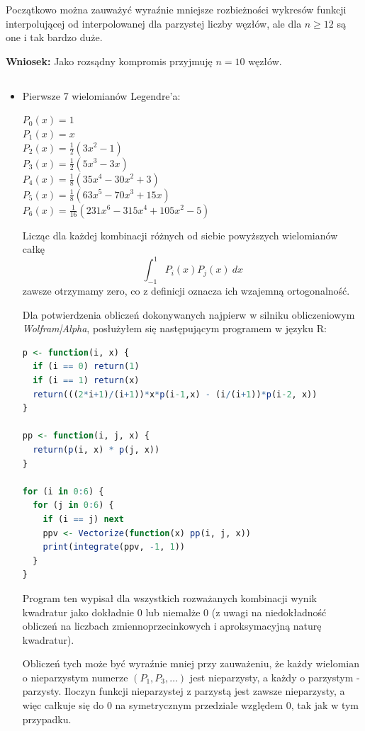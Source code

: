 \documentclass{article}
\begin{document}
\newpage
\noindent
Początkowo można zauważyć wyraźnie mniejsze rozbieżności wykresów funkcji interpolującej od interpolowanej dla parzystej liczby węzłów, ale dla \(n \geq 12\) są one i tak bardzo duże.

\vspace{3mm}
\noindent
\textbf{Wniosek:} Jako rozsądny kompromis przyjmuję \(n = 10\) węzłów.

\subsection{}
\begin{itemize}
    \item Pierwsze 7 wielomianów Legendre'a:
    
    \(P_0(x) = 1\)\\
    \(P_1(x) = x\)\\
    \(P_2(x) = \frac{1}{2}(3x^2 - 1)\)\\
    \(P_3(x) = \frac{1}{2}(5x^3 - 3x)\)\\
    \(P_4(x) = \frac{1}{8}(35x^4 - 30x^2 + 3)\)\\
    \(P_5(x) = \frac{1}{8}(63x^5 - 70x^3 + 15x)\)\\
    \(P_6(x) = \frac{1}{16}(231x^6 - 315x^4 + 105x^2 - 5)\)
    
    Licząc dla każdej kombinacji różnych od siebie powyższych wielomianów całkę
    \[\int_{-1}^1 P_i(x)P_j(x)\ dx\]
    zawsze otrzymamy zero, co z definicji oznacza ich wzajemną ortogonalność.

    Dla potwierdzenia obliczeń dokonywanych najpierw w silniku obliczeniowym \textit{Wolfram|Alpha}, posłużyłem się następującym programem w języku R:
\begin{lstlisting}[language=R]
p <- function(i, x) {
  if (i == 0) return(1)
  if (i == 1) return(x)
  return(((2*i+1)/(i+1))*x*p(i-1,x) - (i/(i+1))*p(i-2, x))
}

pp <- function(i, j, x) {
  return(p(i, x) * p(j, x))
}

for (i in 0:6) {
  for (j in 0:6) {
    if (i == j) next
    ppv <- Vectorize(function(x) pp(i, j, x))
    print(integrate(ppv, -1, 1))
  }
}
\end{lstlisting}
    Program ten wypisał dla wszystkich rozważanych kombinacji wynik kwadratur jako dokładnie 0 lub niemalże 0 (z uwagi na niedokładność obliczeń na liczbach zmiennoprzecinkowych i aproksymacyjną naturę kwadratur).

    \newpage
    \noindent
    Obliczeń tych może być wyraźnie mniej przy zauważeniu, że każdy wielomian o nieparzystym numerze \((P_1, P_3, \ldots)\) jest nieparzysty, a każdy o parzystym - parzysty. Iloczyn funkcji nieparzystej z parzystą jest zawsze nieparzysty, a więc całkuje się do 0 na symetrycznym przedziale względem 0, tak jak w tym przypadku.


\end{itemize}
\end{document}
